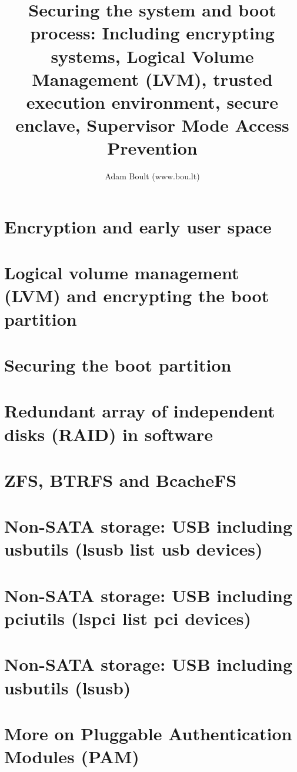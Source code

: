 \documentclass[oneside]{book}
\begin{document}
\author{Adam Boult (www.bou.lt)}
\title{Securing the system and boot process: Including encrypting systems, Logical Volume Management (LVM), trusted execution environment, secure enclave, Supervisor Mode Access Prevention}
\maketitle

\setcounter{tocdepth}{0}
\tableofcontents



\part{Encryption and early user space}




\part{Logical volume management (LVM) and encrypting the boot partition}


\part{Securing the boot partition}



\part{Redundant array of independent disks (RAID) in software}


\part{ZFS, BTRFS and BcacheFS}




\part{Non-SATA storage: USB including usbutils (lsusb list usb devices)}
\part{Non-SATA storage: USB including pciutils (lspci list pci devices)}
\part{Non-SATA storage: USB including usbutils (lsusb)}


\part{More on Pluggable Authentication Modules (PAM)}

\end{document}
